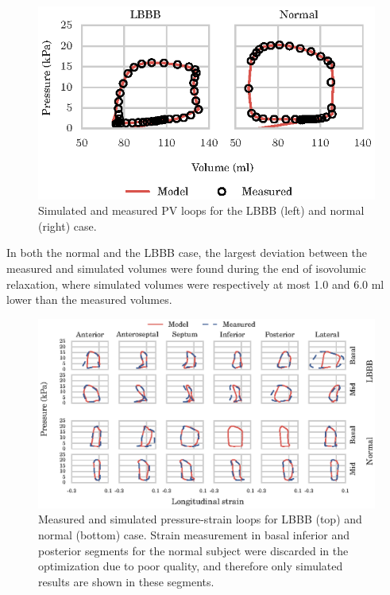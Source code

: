 \begin{figure}[htbp]
  \centering
  \includegraphics{figures/pv_loop}
  \caption{\label{paper4:fig:pv_loops}Simulated and measured PV loops
    for the LBBB (left) and normal (right) case. }
\end{figure}

In both the normal and the LBBB case, the
largest deviation between the measured and simulated volumes were found
during the end of isovolumic relaxation, where simulated volumes were
respectively at most 1.0 and 6.0 ml lower than the measured volumes.


\begin{figure}[htbp]
  \centering
  \includegraphics{figures/pressure_strain_loop}
\caption{\label{paper4:fig:regional_strain_pressure_loops}Measured and
simulated pressure-strain loops for LBBB (top) and normal (bottom)
case. Strain measurement in basal inferior and posterior segments for
the normal subject were discarded in the optimization due to poor
quality, and therefore only simulated results are shown in these
segments.} 
\end{figure}



